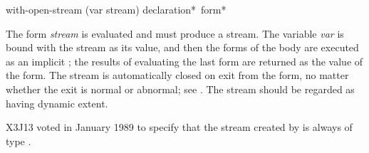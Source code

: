 \begin{defmac}
with-open-stream (var stream) {declaration}* {\,form}*

The form {\it stream} is evaluated and must produce a stream.
The variable {\it var} is bound with the stream as its value,
and then the forms of the body are executed
as an implicit ; the results of evaluating
the last form are returned as the value of the  form.
The stream
is automatically closed on exit from the  form,
no matter whether the exit is normal or abnormal;
see .
The stream should be regarded as having dynamic extent.

\begin{new}
X3J13 voted in January 1989
to specify that the stream created by
 is always of type .
\end{new}
\end{defmac}

